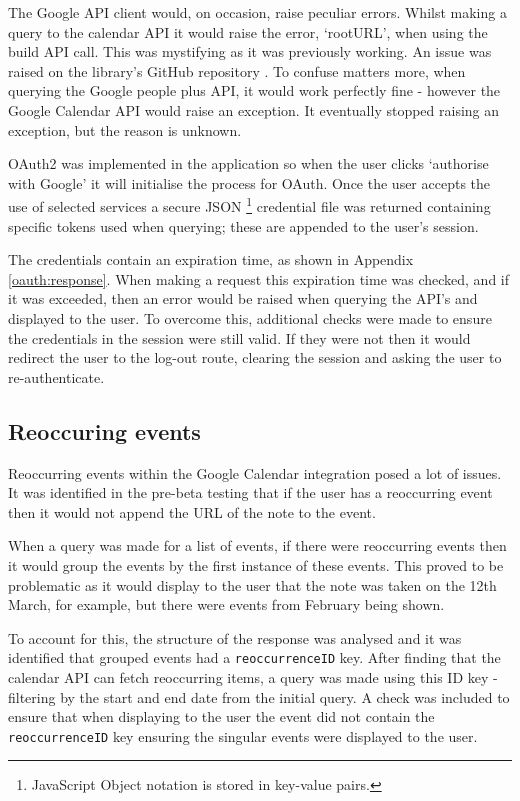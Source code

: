 {{{{{{{The Google API client would, on occasion, raise peculiar errors. Whilst making a query to the calendar API it would raise the error, `rootURL', when using the build API call. This was mystifying as it was previously working. An issue was raised on the library's GitHub repository \cite{citeulike:14021433}. To confuse matters more, when querying the Google people plus API, it would work perfectly fine - however the Google Calendar API would raise an exception. It eventually stopped raising an exception, but the reason is unknown.

OAuth2 was implemented in the application so when the user clicks `authorise with Google' it will initialise the process for OAuth.
Once the user accepts the use of selected services a secure JSON \footnote{JavaScript Object notation is stored in key-value pairs.} credential file was returned containing specific tokens used when querying; these are appended to the user's session.

The credentials contain an expiration time, as shown in Appendix \ref{oauth:response}. When making a request this expiration time was checked, and if it was exceeded, then an error would be raised when querying the API's and displayed to the user. To overcome this, additional checks were made to ensure the credentials in the session were still valid. If they were not then it would redirect the user to the log-out route, clearing the session and asking the user to re-authenticate.

\subsection{Reoccuring events}
Reoccurring events within the Google Calendar integration posed a lot of issues. It was identified in the pre-beta testing that if the user has a reoccurring event then it would not append the URL of the note to the event.

When a query was made for a list of events, if there were reoccurring events then it would group the events by the first instance of these events. This proved to be problematic as it would display to the user that the note was taken on the 12th March, for example, but there were events from February being shown.

To account for this, the structure of the response was analysed and it was identified that grouped events had a \texttt{reoccurrenceID} key. After finding that the calendar API can fetch reoccurring items, a query was made using this ID key - filtering by the start and end date from the initial query. A check was included to ensure that when displaying to the user the event did not contain the \texttt{reoccurrenceID} key ensuring the singular events were displayed to the user.

}}}}}}}
